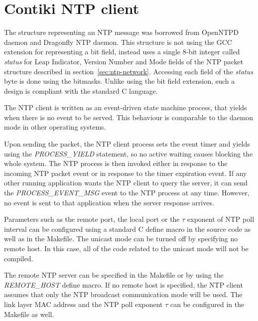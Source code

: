 
\section{Contiki NTP client}
The structure representing an NTP message was borrowed from OpenNTPD daemon
and Dragonfly NTP daemon.
This structure is not using the GCC extension for representing a bit field,
instead uses a single 8-bit integer called {\it{status}}
for Leap Indicator, Version Number and Mode fields of the NTP packet
structure described in section~\ref{sec:ntp-network}.
Accessing each field of the {\it{status}} byte is done using the bitmasks.
Unlike using the bit field extension,
such a design is compliant with the standard C language.

The NTP client is written as an event-driven state machine process,
that yields when there is no event to be served.
This behaviour is comparable to the daemon mode in other operating systems.

Upon sending the packet, the NTP client process sets the event timer and yields
using the {\it{PROCESS\_YIELD}} statement,
so no active waiting causes blocking the whole system.
The NTP process is then invoked either in response to the incoming NTP packet event
or in response to the timer expiration event.
If any other running application wants the NTP client to query the server,
it can send the {\it{PROCESS\_EVENT\_MSG}} event to the NTP process at any time.
However, no event is sent to that application when the server response arrives.

Parameters such as the remote port, the local port
or the $\tau$ exponent of NTP poll interval can be configured using a standard C define macro
in the source code as well as in the Makefile.
The unicast mode can be turned off by specifying no remote host.
In this case, all of the code related to the unicast mode will not be compiled.

The remote NTP server can be specified in the Makefile or
by using the {\it{REMOTE\_HOST}} define macro.
If no remote host is specified, the NTP client assumes that only the NTP broadcast communication mode will be used.
The link layer MAC address and the NTP poll exponent $\tau$
can be configured in the Makefile as well.


